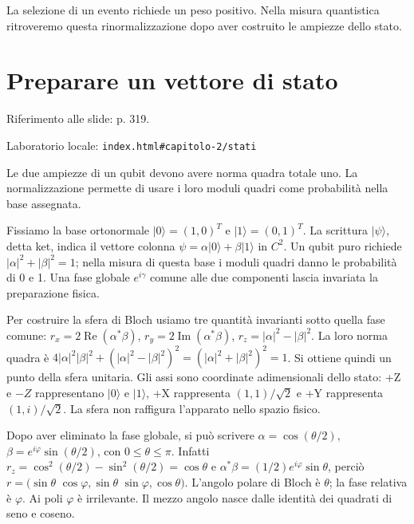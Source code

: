 La selezione di un evento richiede un peso positivo. Nella misura quantistica ritroveremo questa rinormalizzazione dopo aver costruito le ampiezze dello stato.\par



\Needspace{.43\textheight}
\section{Preparare un vettore di stato}
\label{c2-stati}

{\sffamily\small\color{Ink!70} Riferimento alle slide: p. 319.\par}

{\sffamily\small\color{Ink!70} Laboratorio locale: \nolinkurl{index.html#capitolo-2/stati}\par}

Le due ampiezze di un qubit devono avere norma quadra totale uno. La normalizzazione permette di usare i loro moduli quadri come probabilità nella base assegnata.\par

Fissiamo la base ortonormale \(|0\rangle =(1{,}0)^{T}\) e \(|1\rangle =(0{,}1)^{T}\). La scrittura \(|\psi \rangle \), detta ket, indica il vettore colonna \(\psi =\alpha |0\rangle +\beta |1\rangle \) in \(C^{2}\). Un qubit puro richiede \(|\alpha |^{2}+|\beta |^{2}=1\); nella misura di questa base i moduli quadri danno le probabilità di 0 e 1. Una fase globale \(e^{i\gamma }\) comune alle due componenti lascia invariata la preparazione fisica.\par

Per costruire la sfera di Bloch usiamo tre quantità invarianti sotto quella fase comune: \(r_{x}=2\operatorname{Re}(\alpha {}^{*}\beta )\), \(r_{y}=2\operatorname{Im}(\alpha {}^{*}\beta )\), \(r_{z}=|\alpha |^{2}- |\beta |^{2}\). La loro norma quadra è \(4|\alpha |^{2}|\beta |^{2}+(|\alpha |^{2}- |\beta |^{2})^{2}=(|\alpha |^{2}+|\beta |^{2})^{2}=1\). Si ottiene quindi un punto della sfera unitaria. Gli assi sono coordinate adimensionali dello stato: +Z e \(- Z\) rappresentano \(|0\rangle \) e \(|1\rangle \), +X rappresenta \((1{,}1)/\sqrt{2}\) e +Y rappresenta \((1,\allowbreak i)/\sqrt{2}\). La sfera non raffigura l'apparato nello spazio fisico.\par

Dopo aver eliminato la fase globale, si può scrivere \(\alpha =\cos (\theta /2)\), \(\beta =e^{i\varphi }\sin (\theta /2)\), con \(0\le \theta \le \pi \). Infatti \(r_{z}=\cos ^{2}(\theta /2)- \sin ^{2}(\theta /2)=\cos \theta \) e \(\alpha {}^{*}\beta =(1/2)e^{i\varphi }\sin \theta \), perciò \(r=(\sin \theta \) \(\cos \varphi ,\allowbreak \sin \theta \) \(\sin \varphi ,\allowbreak \cos \theta )\). L'angolo polare di Bloch è \(\theta \); la fase relativa è \(\varphi \). Ai poli \(\varphi \) è irrilevante. Il mezzo angolo nasce dalle identità dei quadrati di seno e coseno.\par

